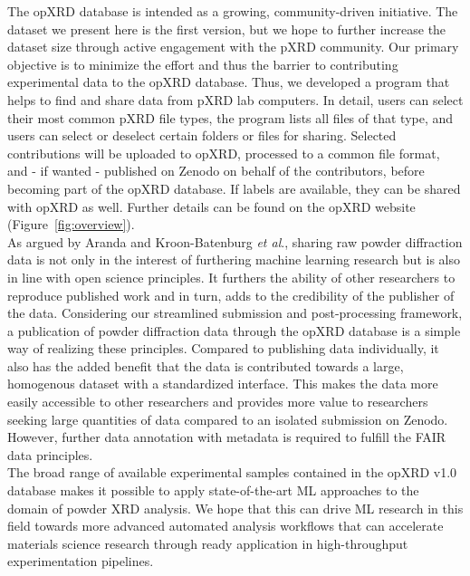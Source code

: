 The opXRD database is intended as a growing, community-driven initiative. The dataset we present here is the first version, but we hope to further increase the dataset size through active engagement with the pXRD community. Our primary objective is to minimize the effort and thus the barrier to contributing experimental data to the opXRD database. Thus, we developed a program that helps to find and share data from pXRD lab computers. In detail, users can select their most common pXRD file types, the program lists all files of that type, and users can select or deselect certain folders or files for sharing. Selected contributions will be uploaded to opXRD, processed to a common file format, and - if wanted - published on Zenodo on behalf of the contributors, before becoming part of the opXRD database. If labels are available, they can be shared with opXRD as well. Further details can be found on the opXRD website (Figure~\ref{fig:overview}). \\

As argued by Aranda and Kroon-Batenburg \textit{et al}.\cite{Aranda2018, Kroon-Batenburg2024}, sharing raw powder diffraction data is not only in the interest of furthering machine learning research but is also in line with open science principles. It furthers the ability of other researchers to reproduce published work and in turn, adds to the credibility of the publisher of the data. Considering our streamlined submission and post-processing framework, a publication of powder diffraction data through the opXRD database is a simple way of realizing these principles. Compared to publishing data individually, it also has the added benefit that the data is contributed towards a large, homogenous dataset with a standardized interface. This makes the data more easily accessible to other researchers and provides more value to researchers seeking large quantities of data compared to an isolated submission on Zenodo. However, further data annotation with metadata is required to fulfill the FAIR data principles.\\

The broad range of available experimental samples contained in the opXRD v1.0 database makes it possible to apply state-of-the-art ML approaches to the domain of powder XRD analysis. We hope that this can drive ML research in this field towards more advanced automated analysis workflows that can accelerate materials science research through ready application in high-throughput experimentation pipelines.